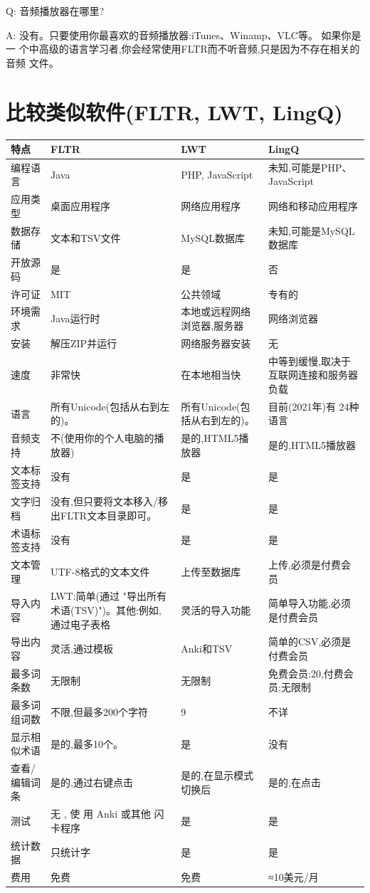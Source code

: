 \documentclass[cn,10pt,math=newtx,citestyle=gb7714-2015,bibstyle=gb7714-2015]{elegantbook}
\begin{document}
Q:
音频播放器在哪里?

A:
没有。只要使用你最喜欢的音频播放器:iTunes、Winamp、VLC等。 如果你是一
个中高级的语言学习者,你会经常使用FLTR而不听音频,只是因为不存在相关的音频
文件。

\chapter{比较类似软件(FLTR, LWT, LingQ)}
\label{比较类似软件(FLTR, LWT, LingQ)}
\renewcommand{\arraystretch}{1.3}%
\begin{table}[htbp]
\centering
\begin{tabularx}{\textwidth}{|X|X|X|X|}
\hline
特点 &FLTR & LWT& LingQ\\\hline
编程语言 &Java &PHP, JavaScript &未知,可能是PHP、JavaScript\\ \hline
应用类型& 桌面应用程序 &网络应用程序 &网络和移动应用程序\\\hline
数据存储& 文本和TSV文件& MySQL数据库& 未知,可能是MySQL数据库\\ \hline
开放源码& 是 &是 &否\\ \hline
许可证&MIT &公共领域 &专有的\\ \hline
环境需求& Java运行时& 本地或远程网络浏览器,服务器&网络浏览器\\ \hline
安装& 解压ZIP并运行 &网络服务器安装& 无\\ \hline
速度& 非常快& 在本地相当快& 中等到缓慢,取决于互联网连接和服务器负载\\ \hline
语言& 所有Unicode(包括从右到左的)。& 所有Unicode(包括从右到左的)。& 目前(2021年)有 24种语言\\ \hline
音频支持& 不(使用你的个人电脑的播放器)&是的,HTML5播放器& 是的,HTML5播放器\\ \hline
文本标签支持& 没有& 是& 是\\ \hline
文字归档& 没有,但只要将文本移入/移出FLTR文本目录即可。& 是& 是\\ \hline
术语标签支持 &没有 &是 &是\\ \hline
文本管理& UTF-8格式的文本文件& 上传至数据库& 上传,必须是付费会员\\ \hline
导入内容& LWT:简单(通过 "导出所有术语(TSV)")。其他:例如,通过电子表格&灵活的导入功能&
 简单导入功能,必须 是付费会员\\ \hline
导出内容& 灵活,通过模板&Anki和TSV& 简单的CSV,必须是付费会员\\ \hline
最多词条数 & 无限制& 无限制& 免费会员:20,付费会员;无限制\\ \hline
最多词组词数& 不限,但最多200个字符 &  9 & 不详\\ \hline
显示相似术语 &  是的,最多10个。& 是& 没有\\ \hline
查看/编辑词条 &  是的,通过右键点击 & 是的,在显示模式切换后 &  是的,在点击\\ \hline
测试 &  无 , 使 用 Anki 或其他 闪 卡程序&  是 &  是\\ \hline
统计数据 & 只统计字 & 是 &  是\\ \hline
费用 & 免费 &  免费 & ≈10美元/月\\\hline
\end{tabularx}
\end{table}
\end{document}
